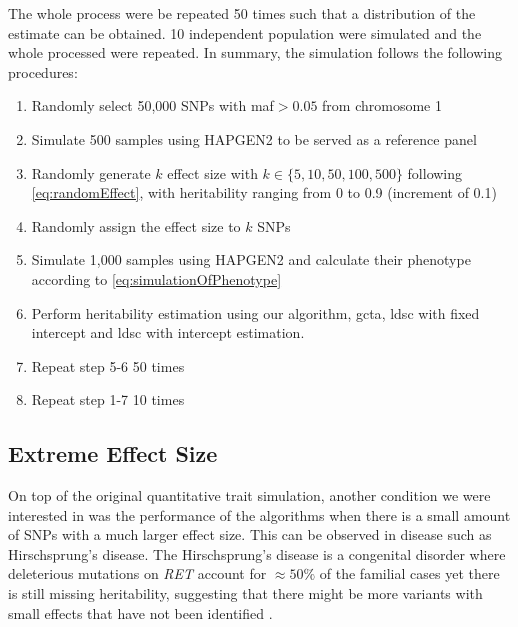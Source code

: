 \documentclass[12pt]{scrbook}
\begin{document}
The whole process were be repeated 50 times such that a distribution of the estimate can be obtained.
10 independent population were simulated and the whole processed were repeated.
In summary, the simulation follows the following procedures:
\begin{enumerate}
	\item Randomly select 50,000 \glspl{SNP} with \gls{maf}$>0.05$ from chromosome 1
	\item Simulate 500 samples using HAPGEN2 to be served as a reference panel
	\item Randomly generate $k$ effect size with $k \in \{5,10,50,100,500\}$ following \cref{eq:randomEffect}, with heritability ranging from 0 to 0.9 (increment of 0.1)
	\item Randomly assign the effect size to $k$ \glspl{SNP}
	\item Simulate 1,000 samples using HAPGEN2 and calculate their phenotype according to \cref{eq:simulationOfPhenotype}
	\item Perform heritability estimation using our algorithm, \gls{gcta}, \gls{ldsc} with fixed intercept and \gls{ldsc} with intercept estimation.
	\item Repeat step 5-6 50 times
	\item Repeat step 1-7 10 times
\end{enumerate}

\subsection{Extreme Effect Size}
On top of the original quantitative trait simulation, another condition we were interested in was the performance of the algorithms when there is a small amount of \glspl{SNP} with a much larger effect size.
This can be observed in disease such as Hirschsprung's disease.
The Hirschsprung's disease is a congenital disorder where deleterious mutations on \textit{RET} account for $\approx50\%$ of the familial cases yet there is still missing heritability, suggesting that there might be more variants with small effects that have not been identified \citep{Gui2013}.
\end{document}
